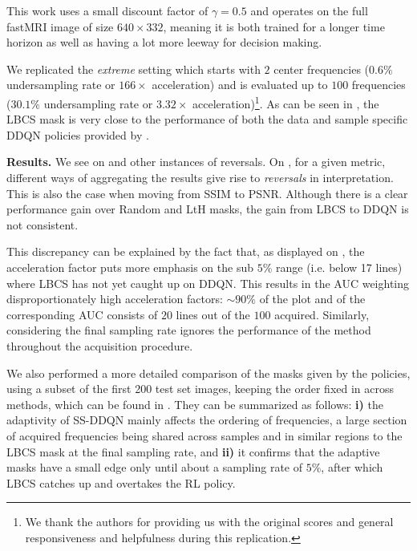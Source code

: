 This work uses a small discount factor of $\gamma=0.5$ and operates on the full fastMRI image of size $640\times332$, meaning it is both trained for a longer time horizon as well as having a lot more leeway for decision making.

We replicated the \textit{extreme} setting which starts with $2$ center frequencies ($0.6\%$ undersampling rate or $166\times$ acceleration) and is evaluated up to $100$ frequencies ($30.1\%$ undersampling rate or $3.32\times$ acceleration)\footnote{We thank the authors for providing us with the original scores and general responsiveness and helpfulness during this replication.}.
As can be seen in , the LBCS mask is very close to the performance of both the data and sample specific DDQN policies provided by \cite{pineda2020active}.

\textbf{Results.} We see on  and   other instances of reversals. On , for a given metric, different ways of aggregating the results give rise to \textit{reversals} in interpretation. This is also the case when moving from SSIM to PSNR. Although there is a clear performance gain over Random and LtH masks, the gain from LBCS to DDQN is not consistent. 

This discrepancy can be explained by the fact that, as displayed on , the acceleration factor puts more emphasis on the sub $5\%$ range (i.e. below 17 lines) where LBCS has not yet caught up on DDQN. This results in the AUC weighting disproportionately high acceleration factors: $\sim 90\%$ of the plot and of the corresponding AUC consists of $20$ lines out of the $100$ acquired. Similarly, considering the final sampling rate ignores the performance of the method throughout the acquisition procedure.


We also performed a more detailed comparison of the masks given by the policies, using a subset of the first 200 test set images, keeping the order fixed in across methods, which can be found in . They can be summarized as follows: \textbf{i)} the adaptivity of SS-DDQN mainly affects the ordering of frequencies, a large section of acquired frequencies being shared across samples and in similar regions to the LBCS mask at the final sampling rate, and \textbf{ii)} it confirms that the adaptive masks have a small edge only until about a sampling rate of $5\%$, after which LBCS catches up and overtakes the RL policy.

\begin{table}[h]
\centering
    \resizebox{\linewidth}{!}{}
    \label{tab:pineda_auc} 
\end{table}


